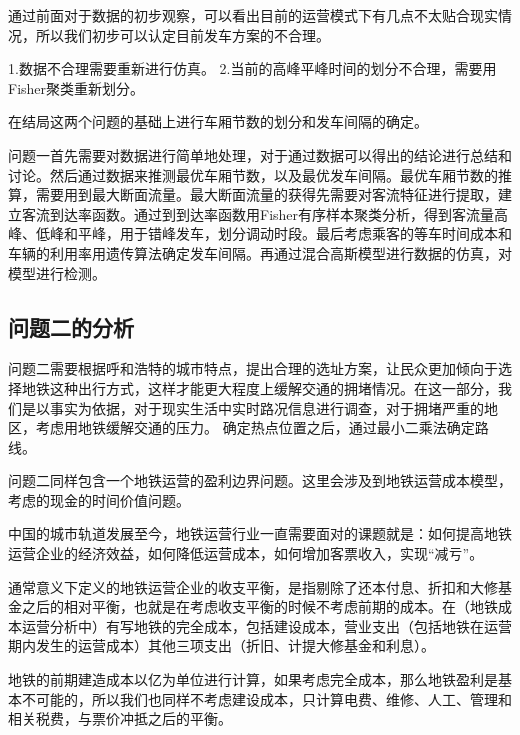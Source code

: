 \documentclass[12pt,a4paper]{mcmthesis}
\begin{document}
    通过前面对于数据的初步观察，可以看出目前的运营模式下有几点不太贴合现实情况，所以我们初步可以认定目前发车方案的不合理。

    1.数据不合理需要重新进行仿真。
    2.当前的高峰平峰时间的划分不合理，需要用Fisher聚类重新划分。

    在结局这两个问题的基础上进行车厢节数的划分和发车间隔的确定。




        {问题一首先需要对数据进行简单地处理，对于通过数据可以得出的结论进行总结和讨论。然后通过数据来推测最优车厢节数，以及最优发车间隔。最优车厢节数的推算，需要用到最大断面流量。最大断面流量的获得先需要对客流特征进行提取，建立客流到达率函数。通过到到达率函数用Fisher有序样本聚类分析，得到客流量高峰、低峰和平峰，用于错峰发车，划分调动时段。最后考虑乘客的等车时间成本和车辆的利用率用遗传算法确定发车间隔。再通过混合高斯模型进行数据的仿真，对模型进行检测。}

    \subsection{问题二的分析}
    问题二需要根据呼和浩特的城市特点，提出合理的选址方案，让民众更加倾向于选择地铁这种出行方式，这样才能更大程度上缓解交通的拥堵情况。在这一部分，我们是以事实为依据，对于现实生活中实时路况信息进行调查，对于拥堵严重的地区，考虑用地铁缓解交通的压力。
    确定热点位置之后，通过最小二乘法确定路线。

        {问题二同样包含一个地铁运营的盈利边界问题。这里会涉及到地铁运营成本模型，考虑的现金的时间价值问题。}
        {中国的城市轨道发展至今，地铁运营行业一直需要面对的课题就是：如何提高地铁运营企业的经济效益，如何降低运营成本，如何增加客票收入，实现“减亏”。

    通常意义下定义的地铁运营企业的收支平衡，是指剔除了还本付息、折扣和大修基金之后的相对平衡，也就是在考虑收支平衡的时候不考虑前期的成本。在（地铁成本运营分析中）有写地铁的完全成本，包括建设成本，营业支出（包括地铁在运营期内发生的运营成本）其他三项支出（折旧、计提大修基金和利息）。

    地铁的前期建造成本以亿为单位进行计算，如果考虑完全成本，那么地铁盈利是基本不可能的，所以我们也同样不考虑建设成本，只计算电费、维修、人工、管理和相关税费，与票价冲抵之后的平衡。}
\end{document}
